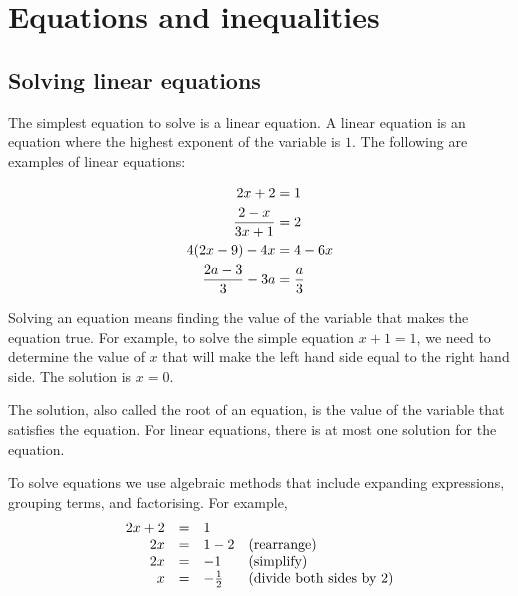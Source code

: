\chapter{Equations and inequalities}
\setcounter{figure}{1}
\setcounter{subfigure}{1}

\section{Solving linear equations}
         
The simplest equation to solve is a linear equation. A linear equation is an
equation where the highest exponent of the variable is $1$. The
following are examples of linear equations:\par 

\begin{align*}
  2x+2 &= 1 \vspace{6pt} \\
  \dfrac{2-x}{3x+1} &= 2 \vspace{6pt} \\
  4(2x-9)-4x &= 4-6x \vspace{6pt} \\ 
  \dfrac{2a-3}{3}-3a &= \dfrac{a}{3}
\end{align*}


Solving an equation means finding the value of the variable that makes
the equation true. For example, to solve the simple equation $x+1=1$,
we need to determine the value of $x$ that will make the left hand
side equal to the right hand side. The solution is $x=0$.

The solution, also called the root of an equation, is the value of the
variable that satisfies the equation. For linear equations, there is
at most one solution for the equation.

To solve equations we use algebraic methods that include expanding
expressions, grouping terms, and factorising. For example,
\begin{equation*}
  \begin{array}{ccll}
    \hfill 2x+2& =& 1\hfill \\ 
    \hfill 2x& =& 1-2\hfill & \mbox{(rearrange)}\hfill \\ 
    \hfill 2x& =& -1\hfill & \mbox{(simplify)}\hfill \\
    \hfill x&=& -\frac{1}{2} & \mbox{(divide both sides by $2$)} \hfill
  \end{array}
\end{equation*}

